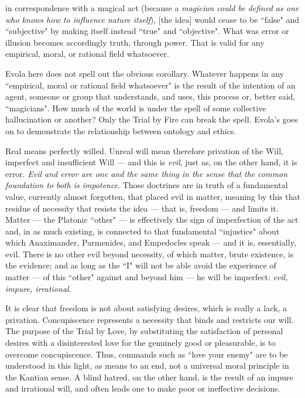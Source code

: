 \begin{quotex}
in correspondence with a magical act (because a \emph{magician could be defined as one who knows how to influence nature itself}), [the idea] would cease to be ``false" and ``subjective" by making itself instead ``true" and ``objective". What was error or illusion becomes accordingly truth, through power. That is valid for any empirical, moral, or rational field whatsoever. 

\end{quotex}
Evola here does not spell out the obvious corollary. Whatever happens in any ``empirical, moral or rational field whatsoever" is the result of the intention of an agent, someone or group that understands, and uses, this process or, better said, ``magicians". How much of the world is under the spell of some collective hallucination or another? Only the Trial by Fire can break the spell. Evola's goes on to demonstrate the relationship between ontology and ethics.

\begin{quotex}
Real means perfectly willed. Unreal will mean therefore privation of the Will, imperfect and insufficient Will — and this is \emph{evil}, just as, on the other hand, it is error. \emph{Evil and error are one and the same thing in the sense that the common foundation to both is impotence}. Those doctrines are in truth of a fundamental value, currently almost forgotten, that placed evil in matter, meaning by this that residue of necessity that resists the idea — that is, freedom — and limits it. Matter — the Platonic ``other" — is effectively the sign of imperfection of the act and, in as much existing, is connected to that fundamental ``injustice" about which Anaximander, Parmenides, and Empedocles speak — and it is, essentially, evil. There is no other evil beyond necessity, of which matter, brute existence, is the evidence; and as long as the ``I" will not be able avoid the experience of matter — of this ``other" against and beyond him — he will be imperfect: \emph{evil, impure, irrational}. 

\end{quotex}
It is clear that freedom is not about satisfying desires, which is really a lack, a privation. Concupiscence represents a necessity that binds and restricts our will. The purpose of the Trial by Love, by substituting the satisfaction of personal desires with a disinterested love for the genuinely good or pleasurable, is to overcome concupiscence. Thus, commands such as ``love your enemy" are to be understood in this light, as means to an end, not a universal moral principle in the Kantian sense. A blind hatred, on the other hand, is the result of an impure and irrational will, and often leads one to make poor or ineffective decisions.

